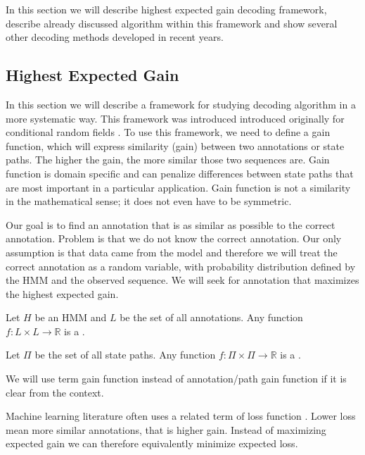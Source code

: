 In this section we will describe highest expected gain decoding framework,
describe already discussed algorithm within this framework and show several
other decoding methods developed in recent years.

\subsection{Highest Expected Gain}

\label{SECTION:HEG}

In this section we will describe a framework for studying decoding algorithm in
a more systematic way. This framework was introduced introduced originally for
conditional random fields \cite{Gross2007}.  To use this framework, we need to
define a gain function, which will express similarity (gain) between two
annotations or state paths. The higher the gain, the more similar those two
sequences are. Gain function is domain specific and can penalize differences
between state paths that are most important in a particular application.  Gain
function is not a similarity in the mathematical sense; it does not even have to
be symmetric.

Our goal is to find an annotation that is as similar as possible to the correct
annotation. Problem is that we do not know the correct annotation. Our only
assumption is that data came from the model and therefore we will treat the
correct annotation as a random variable, with probability distribution defined
by the HMM and the observed sequence. We will seek for annotation that maximizes
the highest expected gain.

\begin{definition}
Let $H$ be an HMM and $L$ be the set of all annotations. Any function
$f:L\times L\to \mathbb{R}$ is a .

Let $\Pi$ be the set of all state paths. Any function $f:\Pi\times
\Pi\to\mathbb{R}$ is a .

\end{definition}

\begin{note}
We will use term gain function instead of annotation/path gain function if it is
clear from the context.

Machine learning literature often uses a related term of loss function
\cite{}. Lower loss mean more similar annotations, that is higher gain. Instead
of maximizing expected gain we can therefore equivalently minimize expected
loss.
\end{note}

